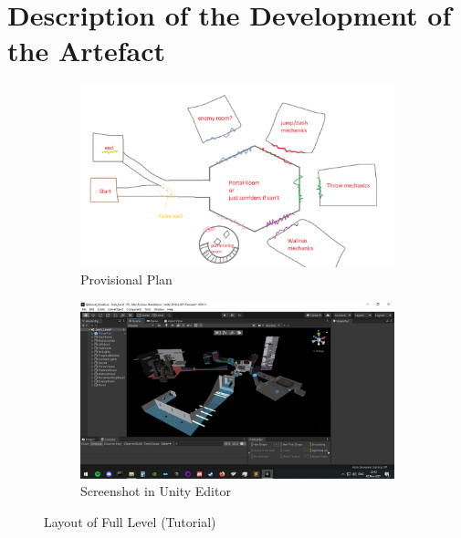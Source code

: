 \section{Description of the Development of the Artefact}


\begin{figure}[H]
\centering
\begin{subfigure}{0.5\textwidth}
  \centering
  \includegraphics[width=1\linewidth]{Figures/fullplan.png}
  \caption{Provisional Plan}
\end{subfigure}%
\begin{subfigure}{0.5\textwidth}
  \centering
  \includegraphics[width=1\linewidth]{Figures/full.png}
  \caption{Screenshot in Unity Editor}
\end{subfigure}
\caption{Layout of Full Level (Tutorial)}
\end{figure}


